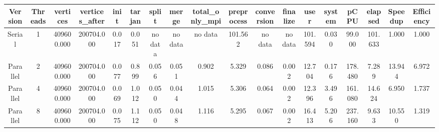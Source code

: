 \begin{tabular}{|c|c|c|c|c|c|c|c|c|c|c|c|c|c|c|c|c|c|}
\toprule
 Version &  Threads &   vertices &  vertices\_after &  init &  tarjan &   split &   merge & total\_only\_mpi &  preprocess & conversion & finalize &    user &  system &    pCPU &  elapsed &  Speedup &  Efficiency \\
\midrule
  Serial &        1 & 409600.000 &      200704.000 & 0.017 &   0.051 & no data & no data &        no data &     101.562 &    no data &  no data & 101.594 &   0.030 &  99.000 &  101.633 &    1.000 &       1.000 \\
Parallel &        2 & 409600.000 &      200704.000 & 0.077 &   0.899 &   0.056 &   0.051 &          0.902 &       5.329 &      0.086 &    0.002 &  12.704 &   0.176 & 178.480 &    7.289 &   13.944 &       6.972 \\
Parallel &        4 & 409600.000 &      200704.000 & 0.069 &   1.012 &   0.050 &   0.044 &          1.015 &       5.306 &      0.064 &    0.002 &  12.396 &   3.496 & 161.080 &   14.624 &    6.950 &       1.737 \\
Parallel &        8 & 409600.000 &      200704.000 & 0.075 &   1.112 &   0.050 &   0.048 &          1.116 &       5.295 &      0.067 &    0.002 &  16.413 &   5.206 & 237.160 &    9.633 &   10.550 &       1.319 \\
\bottomrule
\end{tabular}
